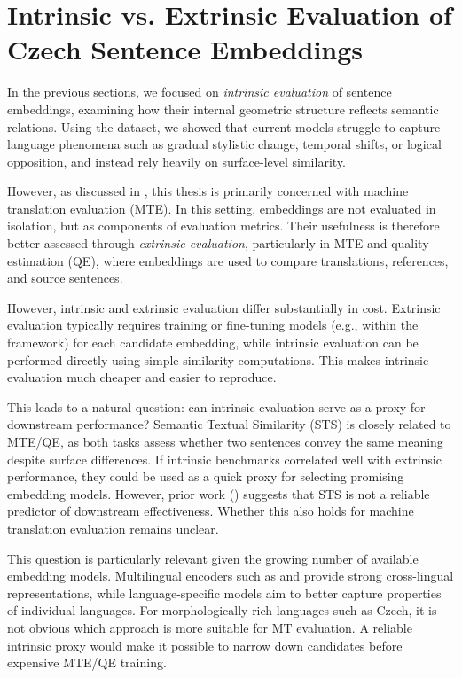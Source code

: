 \section{Intrinsic vs. Extrinsic Evaluation of Czech Sentence Embeddings}
\label{extrinsic}

In the previous sections, we focused on \emph{intrinsic evaluation} of sentence embeddings, examining how their internal geometric structure reflects semantic relations. Using the \costra dataset, we showed that current models struggle to capture language phenomena such as gradual stylistic change, temporal shifts, or logical opposition, and instead rely heavily on surface-level similarity.

However, as discussed in , this thesis is primarily concerned with machine translation evaluation (MTE). In this setting, embeddings are not evaluated in isolation, but as components of evaluation metrics. Their usefulness is therefore better assessed through \emph{extrinsic evaluation}, particularly in MTE and quality estimation (QE), where embeddings are used to compare translations, references, and source sentences.

However, intrinsic and extrinsic evaluation differ substantially in cost. Extrinsic evaluation typically requires training or fine-tuning models (e.g., within the \comet framework) for each candidate embedding, while intrinsic evaluation can be performed directly using simple similarity computations. This makes intrinsic evaluation much cheaper and easier to reproduce.

This leads to a natural question: can intrinsic evaluation serve as a proxy for downstream performance? Semantic Textual Similarity (STS) is closely related to MTE/QE, as both tasks assess whether two sentences convey the same meaning despite surface differences. If intrinsic benchmarks correlated well with extrinsic performance, they could be used as a quick proxy for selecting promising embedding models. However, prior work () suggests that STS is not a reliable predictor of downstream effectiveness. Whether this also holds for machine translation evaluation remains unclear.

This question is particularly relevant given the growing number of available embedding models. Multilingual encoders such as \labse and \xlmr provide strong cross-lingual representations, while language-specific models aim to better capture properties of individual languages. For morphologically rich languages such as Czech, it is not obvious which approach is more suitable for MT evaluation. A reliable intrinsic proxy would make it possible to narrow down candidates before expensive MTE/QE training.

